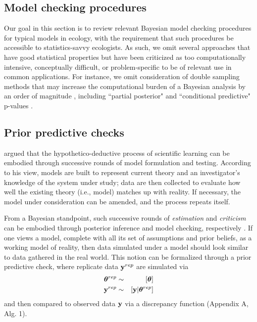 \documentclass[12pt,english]{article}
\begin{document}
\begin{spacing}{1.9}
\section{Model checking procedures}

Our goal in this section is to review relevant Bayesian model checking
procedures for typical models in ecology, with the requirement that
such procedures be accessible to statistics-savvy ecologists.  As
such, we omit several approaches that have good statistical properties
but have been criticized \citep[e.g.,][]{Johnson2007b,Zhang2014} as
too computationally intensive, conceptually difficult, or
problem-specific to be of relevant use in common applications.  For
instance, we omit consideration of double sampling methods that may
increase the computational burden of a Bayesian analysis by an order
of magnitude \citep{Johnson2007b}, including ``partial posterior" and
``conditional predictive" p-values \citep[see
e.g.,][]{BayarriBerger1999,RobinsEtAl2000,BayarriCastellanos2007}.

\subsection{Prior predictive checks}

\citet{Box1980} argued that the hypothetico-deductive process of
scientific learning can be embodied through successive rounds of model
formulation and testing. According to his view, models are built to
represent current theory and an investigator's knowledge of the system
under study; data are then collected to evaluate how well the existing
theory (i.e., model) matches up with reality.  If necessary, the model
under consideration can be amended, and the process repeats itself.

From a Bayesian standpoint, such successive rounds of
\textit{estimation} and \textit{criticism} can be embodied through
posterior inference and model checking, respectively \citep{Box1980}.
If one views a model, complete with all its set of assumptions and
prior beliefs, as a working model of reality, then data simulated
under a model should look similar to data gathered in the real world.
This notion can be formalized through a prior predictive check, where
replicate data ${\bf y}^{rep}$ are simulated via
\begin{eqnarray}
  \label{eq:prior}
  \boldsymbol{\theta}^{rep} & \sim & [\boldsymbol{\theta}] \\
  {\bf y}^{rep} & \sim & [{\bf y}|\boldsymbol{\theta}^{rep}] \nonumber
\end{eqnarray}
and then compared to observed data ${\bf y}$ via a discrepancy function
(Appendix A, Alg. 1).


\end{spacing}
\end{document}
